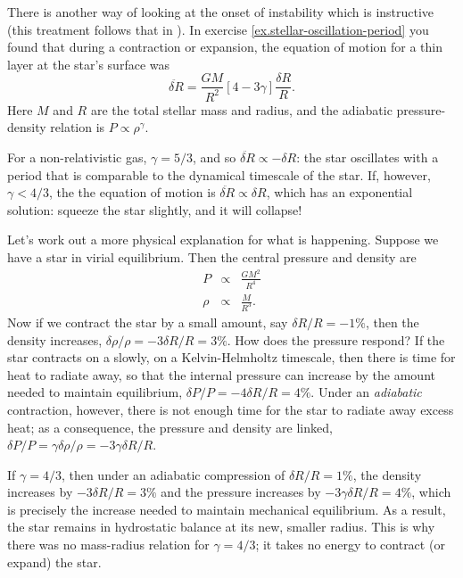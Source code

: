 \begin{sidebar}
There is another way of looking at the onset of instability which is instructive (this treatment follows that in \citet{Cox1980Theory-of-Stell}). In exercise \ref{ex.stellar-oscillation-period} you found that during a contraction or expansion, the equation of motion for a thin layer at the star's surface was
\[
	\ddot{\delta R} = \frac{GM}{R^{2}}\left[4-3\gamma\right]\frac{\delta R}{R}.
\]
Here $M$ and $R$ are the total stellar mass and radius, and the adiabatic pressure-density relation is $P\propto \rho^{\gamma}$.

For a non-relativistic gas, $\gamma = 5/3$, and so $\ddot{\delta R} \propto -\delta R$: the star oscillates with a period that is comparable to the dynamical timescale of the star. If, however, $\gamma < 4/3$, the the equation of motion is $\ddot{\delta R} \propto \delta R$, which has an exponential solution: squeeze the star slightly, and it will collapse!

Let's work out a more physical explanation for what is happening. Suppose we have a star in virial equilibrium. Then the central pressure and density are
\begin{eqnarray*}
P &\propto& \frac{GM^{2}}{R^{4}} \\
\rho &\propto& \frac{M}{R^{3}}.
\end{eqnarray*}
Now if we contract the star by a small amount, say $\delta R/R = -1\%$, then the density increases, $\delta\rho/\rho = -3\delta R/R = 3\%$. How does the pressure respond? If the star contracts on a slowly, on a Kelvin-Helmholtz timescale, then there is time for heat to radiate away, so that the internal pressure can increase by the amount needed to maintain equilibrium, $\delta P/P = -4\delta R/R = 4\%$. Under an \emph{adiabatic} contraction, however, there is not enough time for the star to radiate away excess heat; as a consequence, the pressure and density are linked, $\delta P/P = \gamma\delta \rho/\rho = -3\gamma\delta R/R$.

If $\gamma = 4/3$, then under an adiabatic compression of $\delta R/R = 1\%$, the density increases by $-3\delta R/R = 3\%$ and the pressure increases by $-3\gamma\delta R/R = 4\%$, which is precisely the increase needed to maintain mechanical equilibrium. As a result, the star remains in hydrostatic balance at its new, smaller radius. This is why there was no mass-radius relation for $\gamma = 4/3$; it takes no energy to contract (or expand) the star.


\end{sidebar}
